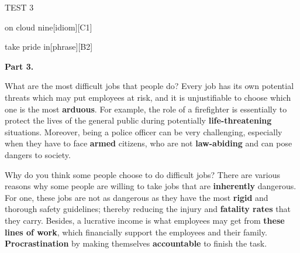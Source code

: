 \begin{glossarymc}[Cambridge 14]
\begin{test}{TEST 3}
\begin{VocabExplain}[Part 2]
            \begin{ExplainCard}{on cloud nine}[idiom][C1]
            \end{ExplainCard}

            \begin{ExplainCard}{take pride in}[phrase][B2]
            \end{ExplainCard}
        \end{VocabExplain}

    \noindent
    \textbf{Part 3.}
    \begin{qa}{What are the most difficult jobs that people do?}
    Every job has its own potential threats which may put employees at risk, and it is unjustifiable to choose which one is the most \textbf{arduous}. For example, the role of a firefighter is essentially to protect the lives of the general public during potentially \textbf{life-threatening} situations. Moreover, being a police officer can be very challenging, especially when they have to face \textbf{armed} citizens, who are not \textbf{law-abiding} and can pose dangers to society.
    \end{qa}

    \begin{qa}{Why do you think some people choose to do difficult jobs?}
    There are various reasons why some people are willing to take jobs that are \textbf{inherently} dangerous. For one, these jobs are not as dangerous as they have the most \textbf{rigid} and thorough safety guidelines; thereby reducing the injury and \textbf{fatality rates} that they carry. Besides, a lucrative income is what employees may get from \textbf{these lines of work}, which financially support the employees and their family. \textbf{Procrastination} by making themselves \textbf{accountable} to finish the task.
    \end{qa}


\end{test}
\end{glossarymc}
